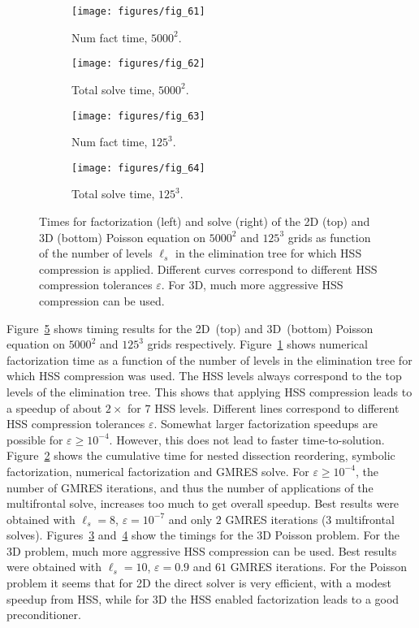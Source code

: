 \documentclass{article}
\begin{document}
\begin{figure}
  \begin{center}
    \begin{subfigure}{.49\textwidth}
      \texttt{[image: figures/fig\_61]}
      \caption{\footnotesize Num fact time, $5000^2$.}
      \label{fig:61}
    \end{subfigure}
    \begin{subfigure}{.49\textwidth}
      \texttt{[image: figures/fig\_62]}
      \caption{\footnotesize Total solve time, $5000^2$.}
      \label{fig:62}
    \end{subfigure}
    \begin{subfigure}{.49\textwidth}
      \texttt{[image: figures/fig\_63]}
      \caption{\footnotesize Num fact time, $125^3$.}
      \label{fig:63}
    \end{subfigure}
    \begin{subfigure}{.49\textwidth}
      \texttt{[image: figures/fig\_64]}
      \caption{\footnotesize Total solve time, $125^3$.}
      \label{fig:64}
    \end{subfigure}
  \end{center}
  \caption{\footnotesize Times for factorization (left) and solve (right) of
    the 2D (top) and 3D (bottom) Poisson equation on $5000^2$ and
    $125^3$ grids as function of the number of levels $\ell_s$ in the
    elimination tree for which HSS compression is applied. Different
    curves correspond to different HSS compression tolerances
    $\varepsilon$. For 3D, much more aggressive HSS compression can be
    used.}
  \label{fig:Poisson2D3D}
\end{figure}
Figure~\ref{fig:Poisson2D3D} shows timing results for the 2D~(top) and
3D~(bottom) Poisson equation on $5000^2$ and $125^3$ grids
respectively. Figure~\ref{fig:61} shows numerical factorization time
as a function of the number of levels in the elimination tree for
which HSS compression was used. The HSS levels always correspond to
the top levels of the elimination tree. This shows that applying HSS
compression leads to a speedup of about $2 \times$ for $7$ HSS
levels. Different lines correspond to different HSS compression
tolerances $\varepsilon$. Somewhat larger factorization speedups are
possible for $\varepsilon \geq 10^{-4}$. However, this does not lead
to faster time-to-solution. Figure~\ref{fig:62} shows the cumulative
time for nested dissection reordering, symbolic factorization,
numerical factorization and GMRES solve. For $\varepsilon \geq
10^{-4}$, the number of GMRES iterations, and thus the number of
applications of the multifrontal solve, increases too much to get
overall speedup. Best results were obtained with $\ell_s = 8$,
$\varepsilon = 10^{-7}$ and only $2$ GMRES iterations ($3$
multifrontal solves). Figures~\ref{fig:63} and~\ref{fig:64} show the
timings for the 3D Poisson problem. For the 3D problem, much more
aggressive HSS compression can be used. Best results were obtained
with $\ell_s= 10$, $\varepsilon = 0.9$ and $61$ GMRES iterations. For
the Poisson problem it seems that for 2D the direct solver is very
efficient, with a modest speedup from HSS, while for 3D the HSS
enabled factorization leads to a good preconditioner.
\end{document}

